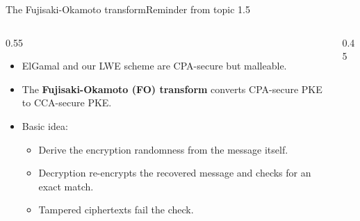 \ifdefined\PRESENTATION\else\PassOptionsToClass{handout}{beamer}\fi\documentclass[aspectratio=169, lualatex]{beamer}
\begin{document}
\begin{frame}{The Fujisaki-Okamoto transform}{Reminder from topic 1.5}
	\begin{columns}[c]
		\begin{column}{0.55\textwidth}
			\begin{itemize}
				\item ElGamal and our LWE scheme are CPA-secure but malleable.
				\item The \textbf{Fujisaki-Okamoto (FO) transform} converts CPA-secure PKE to CCA-secure PKE.
				\item Basic idea:
				      \begin{itemize}
					      \item Derive the encryption randomness from the message itself.
					      \item Decryption re-encrypts the recovered message and checks for an exact match.
					      \item Tampered ciphertexts fail the check.
				      \end{itemize}
			\end{itemize}
		\end{column}
		\begin{column}{0.45\textwidth}
		\end{column}
	\end{columns}
\end{frame}
\end{document}
